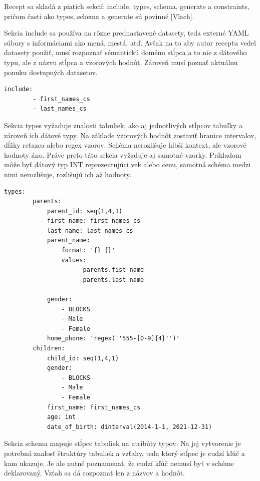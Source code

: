 Recept sa skladá z piatich sekcií: include, types, schema, generate a constraints, pričom časti ako types, schema a generate sú povinné [Vlach].


Sekcia include sa používa na rôzne prednastavené datasety, teda externé YAML súbory s informáciami ako mená, mestá, atď. Avšak na to aby autor receptu vedel datasety použiť, musí rozpoznať sémantickú doménu stĺpca a to nie z dátového typu, ale z názvu stĺpca a vzorových hodnôt. Zároveň musí poznať aktuálnu ponuku dostupných datasetov. 

\begin{lstlisting}[caption={Include seckcia pre ukážkovú databázu}, label={lst:recipe-include}]
    include:
        - first_names_cs
        - last_names_cs
\end{lstlisting}

Sekcia types vyžaduje znalosti tabuliek, ako aj jednotlivých stĺpcov tabuľky a zároveň ich dátové typy. Na základe vzorových hodnôt zostaviť hranice intervalov, dĺžky reťazca alebo regex vzorov. Schéma nerozlišuje hlbší kontext, ale vzorové hodnoty áno. Práve preto táto sekcia vyžaduje aj samotné vzorky. Príkladom môže byť dátový typ INT reprezentujúci vek alebo cenu, samotná schéma medzi nimi nerozlišuje, rozlišujú ich až hodnoty.

\begin{lstlisting}[caption={Types seckcia pre ukážkovú databázu}, label={lst:recipe-types}]
    types:
        parents:
            parent_id: seq(1,4,1)
            first_name: first_names_cs
            last_name: last_names_cs
            parent_name:
                format: '{} {}'
                values:
                    - parents.fist_name
                    - parents.last_name

            gender:
                - BLOCKS
                - Male
                - Female
            home_phone: 'regex(''555-[0-9]{4}'')'
        children:
            child_id: seq(1,4,1)
            gender:
                - BLOCKS
                - Male
                - Female
            first_name: first_names_cs
            age: int
            date_of_birth: dinterval(2014-1-1, 2021-12-31)
\end{lstlisting}

Sekcia schema mapuje stĺpce tabuliek na atribúty typov. Na jej vytvorenie je potrebná znalosť štruktúry tabuliek a vzťahy, teda ktorý stĺpec je cudzí kľúč a kam ukazuje. Je ale nutné poznamenať, že cudzí kľúč nemusí byť v schéme deklarovaný. Vzťah sa dá rozpoznať len z názvov a hodnôt. 

